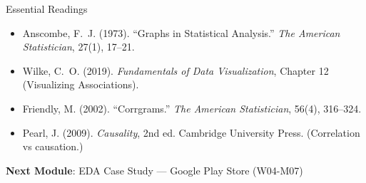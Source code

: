 \documentclass[10pt]{beamer}
\begin{document}
\begin{frame}{Essential Readings}
  \begin{itemize}
    \item Anscombe, F.~J. (1973). ``Graphs in Statistical Analysis.''
          \emph{The American Statistician}, 27(1), 17--21.
    \item Wilke, C.~O. (2019). \emph{Fundamentals of Data Visualization},
          Chapter 12 (Visualizing Associations).
    \item Friendly, M. (2002). ``Corrgrams.'' \emph{The American
          Statistician}, 56(4), 316--324.
    \item Pearl, J. (2009). \emph{Causality}, 2nd ed. Cambridge
          University Press. (Correlation vs causation.)
  \end{itemize}
  \vspace{6pt}
  \textbf{Next Module}: EDA Case Study --- Google Play Store (W04-M07)
\end{frame}
\end{document}
